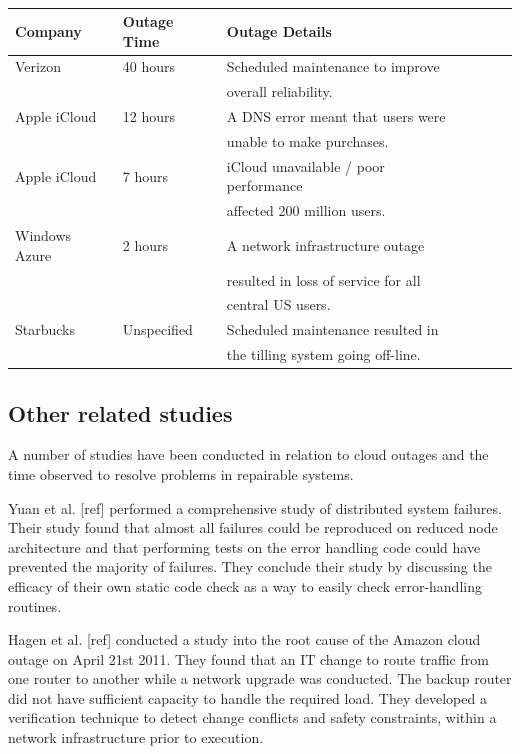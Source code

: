 \documentclass[conference]{IEEEtran}
\begin{document}
\begin {table}[]
\caption {}
\begin{flushleft}
\begin{tabular}{l*{5}{l}r} Company & Outage Time & Outage Details 
\\ \hline Verizon	& 40 hours & Scheduled maintenance to  improve 
\\ & & overall reliability.
\\ Apple iCloud & 12 hours & A DNS error meant that users were 
\\ & & unable to make  purchases.
\\ Apple iCloud	& 7 hours & iCloud unavailable / poor performance 
\\ & & affected 200 million  users.
\\  Windows Azure & 2 hours & A network infrastructure outage  
\\ & & resulted in loss of service for all 
\\ & & central US users.
\\  Starbucks & Unspecified &  Scheduled maintenance resulted in 
\\ & & the tilling system going off-line.  \end{tabular}
\end{flushleft}
\end{table}



\subsection{Other related studies}
A number of studies have been conducted in relation to cloud outages and the time observed to resolve problems in repairable systems. \par

Yuan et al. [ref] performed a comprehensive study of distributed system failures. Their study found that almost all failures could be reproduced on reduced node architecture and that performing tests on the error handling code could have prevented the majority of failures. They conclude their study by discussing the efficacy of their own static code check as a way to easily check error-handling routines. \par

Hagen et al. [ref] conducted a study into the root cause of the Amazon cloud outage on April 21st 2011. They found that an IT change to route traffic from one router to another while a network upgrade was conducted. The backup router did not have sufficient capacity to handle the required load. They developed a verification technique to detect change conflicts and safety constraints, within a network infrastructure prior to execution. \par
\end{document}
